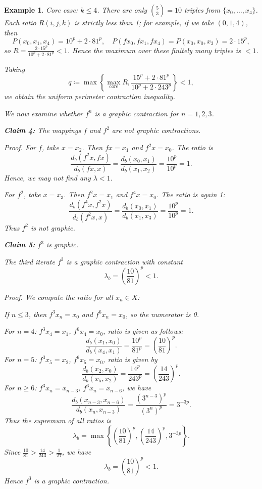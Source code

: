 \documentclass[a4paper,12pt,oneside]{article}
\newtheorem{example}[theorem]{Example}
\numberwithin{equation}{section}
\begin{document}
\begin{example}
Core case: $k\leq 4$. There are only $\binom{5}{3} = 10$ triples from $\{x_{0},\ldots,x_{4}\}$. Each ratio $R(i,j,k)$ is strictly less than 1; for example, if we take $(0,1,4)$, then
\[
P(x_{0},x_{1},x_{4}) = 10^{p} + 2\cdot 81^{p},\quad P(fx_{0},fx_{1},fx_{4}) = P(x_{0},x_{0},x_{3}) = 2\cdot 15^{p},
\]
so $R = \frac{2\cdot 15^{p}}{10^{p} + 2\cdot 81^{p}} < 1$. Hence the maximum over these finitely many triples is $< 1$.

Taking
\[
q\coloneqq \max \left\{\underset {\text{core}}{\max}R,\frac{15^{p} + 2\cdot 81^{p}}{10^{p} + 2\cdot 243^{p}}\right\} < 1,
\]
we obtain the uniform perimeter contraction inequality.

We now examine whether $f^{n}$ is a graphic contraction for $n = 1,2,3$.

\noindent\textbf{Claim 4:} The mappings $f$ and $f^{2}$ are not graphic contractions.

\textit{Proof.} For $f$, take $x = x_{2}$. Then $f x = x_{1}$ and $f^{2}x = x_{0}$. The ratio is
\[
\frac{d_{b}(f^{2}x,f x)}{d_{b}(f x,x)} = \frac{d_{b}(x_{0},x_{1})}{d_{b}(x_{1},x_{2})} = \frac{10^{p}}{10^{p}} = 1.
\]
Hence, we may not find any $\lambda < 1$.

For $f^{2}$, take $x = x_{3}$. Then $f^{2}x = x_{1}$ and $f^{4}x = x_{0}$. The ratio is again 1:
\[
\frac{d_{b}(f^{4}x,f^{2}x)}{d_{b}(f^{2}x,x)} = \frac{d_{b}(x_{0},x_{1})}{d_{b}(x_{1},x_{3})} = \frac{10^{p}}{10^{p}} = 1.
\]
Thus $f^{2}$ is not graphic.

\noindent\textbf{Claim 5:} $f^{3}$ is graphic.

The third iterate $f^{3}$ is a graphic contraction with constant
\[
\lambda_{b} = \left(\frac{10}{81}\right)^{p}< 1.
\]

\textit{Proof.} We compute the ratio for all $x_{n}\in X$:

If $n\leq 3$, then $f^{3}x_{n} = x_{0}$ and $f^{6}x_{n} = x_{0}$, so the numerator is 0.

For $n = 4$: $f^{3}x_{4} = x_{1}$, $f^{6}x_{4} = x_{0}$, ratio is given as follows:
\[
\frac{d_{b}(x_{1},x_{0})}{d_{b}(x_{4},x_{1})} = \frac{10^{p}}{81^{p}} = \left(\frac{10}{81}\right)^{p}.
\]
For $n = 5$: $f^{3}x_{5} = x_{2}$, $f^{6}x_{5} = x_{0}$, ratio is given by
\[
\frac{d_{b}(x_{2},x_{0})}{d_{b}(x_{5},x_{2})} = \frac{14^{p}}{243^{p}} = \left(\frac{14}{243}\right)^{p}.
\]
For $n\geq 6$: $f^{3}x_{n} = x_{n - 3}$, $f^{6}x_{n} = x_{n - 6}$, we have
\[
\frac{d_{b}(x_{n - 3},x_{n - 6})}{d_{b}(x_{n},x_{n - 3})} = \frac{(3^{n - 3})^{p}}{(3^{n})^{p}} = 3^{-3p}.
\]
Thus the supremum of all ratios is
\[
\lambda_{b} = \max \left\{\left(\frac{10}{81}\right)^{p},\left(\frac{14}{243}\right)^{p},3^{-3p}\right\}.
\]
Since $\frac{10}{81} >\frac{14}{243} >\frac{1}{27}$, we have
\[
\lambda_{b} = \left(\frac{10}{81}\right)^{p}< 1.
\]
Hence $f^{3}$ is a graphic contraction.
\end{example}
\end{document}
